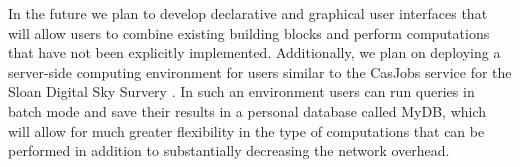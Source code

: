 \documentclass{sig-alternate}
\begin{document}
In the future we plan to develop
declarative and graphical user interfaces that will allow users to combine existing building blocks and perform computations that have not been explicitly
implemented. Additionally, we plan on deploying a server-side computing environment for users similar to the CasJobs service for the Sloan Digital Sky Survery \cite{LiThakar}. In such an environment users can run queries in batch mode and save their results in a personal database called MyDB, which 
will allow for much greater flexibility in the type of computations that can be performed in addition to substantially decreasing the network overhead.



\end{document}
